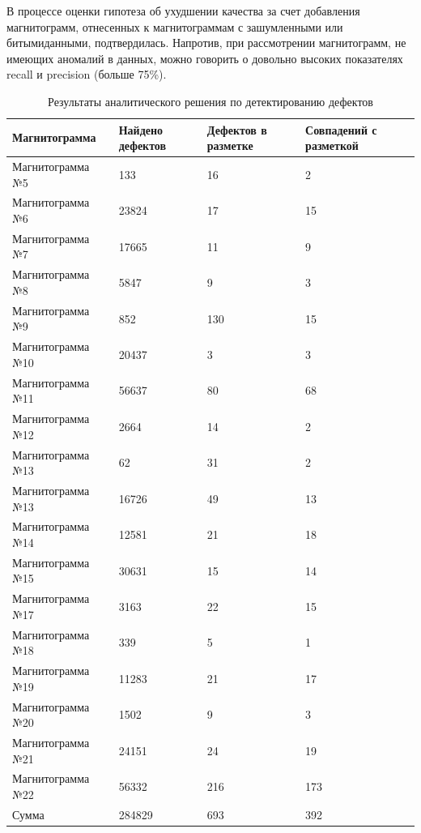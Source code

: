 \documentclass[a4paper,article,14pt]{extarticle}
\begin{document}
В процессе оценки гипотеза об ухудшении качества за счет добавления магнитограмм, отнесенных к магнитограммам 
с зашумленными или \flqq битыми\frqq данными, подтвердилась. Напротив, при рассмотрении магнитограмм, не имеющих аномалий 
в данных, можно говорить о довольно высоких показателях recall и precision (больше 75\%).

\begin{center}
    \begin{longtable}{|p{5cm}|p{3cm}|p{3cm}|p{3cm}|}
        \caption{Результаты аналитического решения по детектированию дефектов}\\\hline
        Магнитограмма & Найдено дефектов & Дефектов в разметке & Совпадений с разметкой \\ \hline
        Магнитограмма №5	& 133	& 16	& 2 \\ \hline
        Магнитограмма №6	& 23824	& 17	& 15 \\ \hline
        Магнитограмма №7	& 17665	& 11	& 9 \\ \hline
        Магнитограмма №8	& 5847	& 9	    & 3 \\ \hline
        Магнитограмма №9	& 852	& 130	& 15 \\ \hline
        Магнитограмма №10	& 20437	& 3	    & 3 \\ \hline
        Магнитограмма №11	& 56637	& 80	& 68 \\ \hline
        Магнитограмма №12	& 2664	& 14	& 2 \\ \hline
        Магнитограмма №13	& 62	& 31	& 2 \\ \hline
        Магнитограмма №13	& 16726	& 49	& 13 \\ \hline
        Магнитограмма №14	& 12581	& 21	& 18 \\ \hline
        Магнитограмма №15	& 30631	& 15	& 14 \\ \hline
        Магнитограмма №17	& 3163	& 22	& 15 \\ \hline
        Магнитограмма №18	& 339	& 5	    & 1 \\ \hline
        Магнитограмма №19	& 11283	& 21	& 17 \\ \hline
        Магнитограмма №20	& 1502	& 9	    & 3 \\ \hline
        Магнитограмма №21	& 24151	& 24	& 19 \\ \hline
        Магнитограмма №22	& 56332	& 216	& 173 \\ \hline
        Сумма	& 284829	& 693	& 392 \\ \hline
    \end{longtable}
\end{center}
\end{document}
